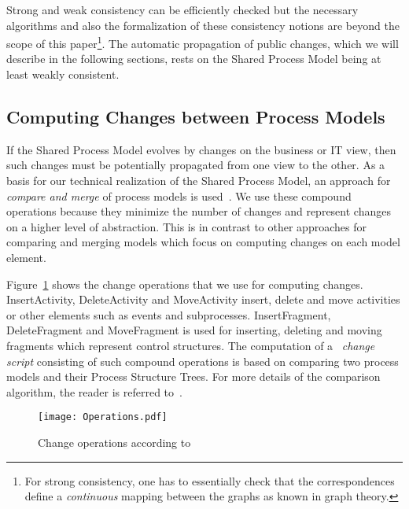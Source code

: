 Strong and weak consistency can be efficiently checked but the necessary algorithms and also the formalization of these consistency notions are beyond the scope of this paper\footnote{For strong consistency, one has to essentially check that the correspondences define a \emph{continuous} mapping between the graphs as known in graph theory.}.
%
The automatic propagation of public changes, which we will describe in the following sections, rests on the Shared Process Model being at least weakly consistent.

 

\subsection{Computing Changes between Process Models}

If the Shared Process Model evolves by changes on the business or IT view, then such changes must be potentially propagated from one view to the other. As a basis for our technical realization of the Shared Process Model, an approach for \emph{ compare and merge} of process models is used~\cite{KuesterGFE08}. We use these compound operations because they minimize the number of changes and represent changes on a higher level of abstraction. This is in contrast to other approaches for comparing and merging models which focus on computing changes on each model element. 

Figure~\ref{fig:ChangeOps} shows the change operations that we use for computing changes. InsertActivity, DeleteActivity and MoveActivity insert, delete and move activities or other elements such as events and subprocesses. InsertFragment, DeleteFragment and MoveFragment is used for inserting, deleting and moving fragments which represent control structures. The computation of a ~\emph{change script} consisting of such compound operations is based on comparing two process models and their  Process Structure Trees. For more details of the comparison algorithm, the reader is referred to~\cite{KuesterGFE08}.


\begin{figure}[h]
\begin{center}
\texttt{[image: Operations.pdf]}
\caption{Change operations according to~\cite{KuesterGFE08}}
\label{fig:ChangeOps}
\end{center}
\end{figure}

